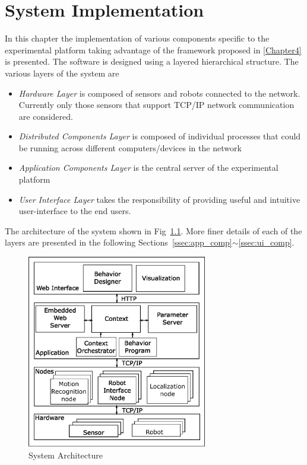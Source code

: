 
\chapter{System Implementation} %

\label{Chapter5} %

In this chapter the implementation of various components specific to the experimental platform taking advantage of the framework proposed in \ref{Chapter4} is presented. The software is designed using a layered hierarchical structure. The various layers of the system are
\begin{itemize}
\item \emph{Hardware Layer} is composed of sensors and robots connected to the network. Currently only those sensors that support TCP/IP network communication are considered.
\item \emph{Distributed Components Layer} is composed of individual processes that could be running across different computers/devices in the network
\item \emph{Application Components Layer} is the central server of the experimental platform
\item \emph{User Interface Layer} takes the responsibility of providing useful and intuitive user-interface to the end users.
\end{itemize}
The architecture of the system shown in Fig~\ref{fig:architecture}. More finer details of each of the layers are presented in the following Sections~\ref{ssec:app_comp}$\sim$\ref{ssec:ui_comp}.
\begin{figure}
\centering
\includegraphics[width=0.7\textwidth]{assets/architecture.eps}
\caption[System Architecture]{System Architecture}
\label{fig:architecture}
\end{figure}
